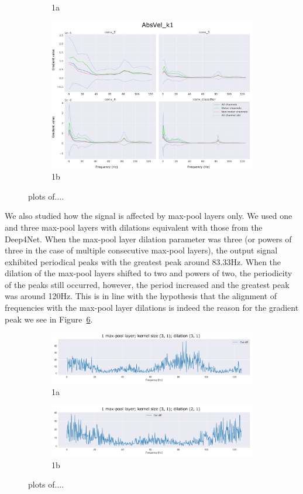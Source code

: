 \begin{figure}
\begin{subfigure}{.5\textwidth}
  \caption{1a}
  \label{fig:absVel-k2-d3}
\end{subfigure}%
\begin{subfigure}{.5\textwidth}
  \centering
  \includegraphics[width=.8\linewidth]{img/ch4/absVel-k1}
  \caption{1b}
  \label{fig:absVel-k1}
\end{subfigure}
\caption{plots of....}
\label{fig:gradient-peak}
\end{figure}

We also studied how the signal is affected by max-pool layers only.
We used one and three max-pool layers with dilations equivalent with those from the Deep4Net.
When the max-pool layer dilation parameter was three (or powers of three in the case of multiple consecutive max-pool layers), the output signal exhibited periodical peaks with the greatest peak around 83.33Hz.
When the dilation of the max-pool layers shifted to two and powers of two, the periodicity of the peaks still occurred, however, the period increased and the greatest peak was around 120Hz.
This is in line with the hypothesis that the alignment of frequencies with the max-pool layer dilations is indeed the reason for the gradient peak we see in Figure~\ref{fig:max-pool-changes}.

\begin{figure}
\begin{subfigure}{.5\textwidth}
  \centering
  \includegraphics[width=.8\linewidth]{img/ch4/absVel-maxpool-k3-d3}
  \caption{1a}
  \label{fig:maxpool-k3-d3}
\end{subfigure}%
\begin{subfigure}{.5\textwidth}
  \centering
  \includegraphics[width=.8\linewidth]{img/ch4/absVel-maxpool-k3-d2}
  \caption{1b}
  \label{fig:maxpool-k3-d2}
\end{subfigure}
\caption{plots of....}
\label{fig:max-pool-changes}
\end{figure}

